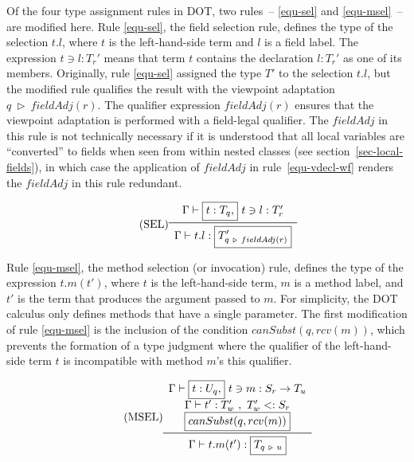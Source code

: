 Of the four type assignment rules in DOT, two rules~-- \ref{equ-sel} and \ref{equ-msel}~--
are modified here. Rule \ref{equ-sel}, the field selection rule,
defines the type of the selection \mbox{$t.l$}, where $t$ is the left-hand-side term
and $l$ is a field label. The expression \mbox{$t \ni l : T_r'$}
means that term $t$ contains the declaration \mbox{$l : T_r'$} as one of its members.
Originally, rule \ref{equ-sel} assigned the type $T'$ to the selection \mbox{$t.l$},
but the modified rule qualifies the result with the viewpoint adaptation
\mbox{$q\ \triangleright\ fieldAdj(r)$}.
The qualifier expression \mbox{$fieldAdj(r)$} ensures that the viewpoint adaptation
is performed with a field-legal qualifier.
The $fieldAdj$ in this rule is not technically necessary if it is understood that
all local variables are ``converted'' to fields when seen from within nested classes
(see section~\ref{sec-local-fields}), in which case the application of $fieldAdj$
in rule~\ref{equ-vdecl-wf} renders the $fieldAdj$ in this rule redundant.

\begin{equation*}\tag{SEL}\label{equ-sel}
\begin{array}{c}
\Gamma \vdash \boxed{t : T_q,}\ t \ni l : T_r' \\
\midrule
\Gamma \vdash t.l : \boxed{T_{q\ \triangleright\ fieldAdj(r)}'} \\
\end{array}
\end{equation*}

\vspace{0.4cm}

Rule \ref{equ-msel}, the method selection (or invocation) rule, defines the type of
the expression $t.m(t')$, where $t$ is the left-hand-side term,
$m$ is a method label, and $t'$ is the term that produces the argument
passed to $m$. For simplicity, the DOT calculus only defines methods that
have a single parameter.
The first modification of rule \ref{equ-msel} is the inclusion of the
condition $canSubst(q, rcv(m))$, which prevents the formation of a type
judgment where the qualifier of the left-hand-side term $t$ is incompatible with
method $m$'s {\cd this} qualifier.

\begin{equation*}\tag{MSEL}\label{equ-msel}
\begin{array}{c}
\Gamma \vdash \boxed{t: U_q,}\ t \ni m: S_r \rightarrow T_u \\
\Gamma \vdash t': T_w'\ ,\ T_w' <: S_r \\
\boxed{canSubst(q, rcv(m))} \\
\midrule
\Gamma \vdash t.m(t'): \boxed{T_{q\ \triangleright\ u}} \\
\end{array}
\end{equation*}


